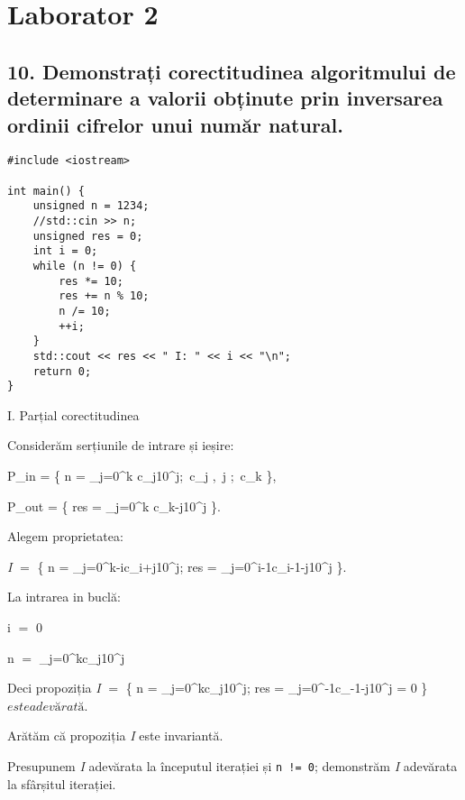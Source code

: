 \documentclass[11pt]{article}
\begin{document}
\pagebreak

\section*{Laborator 2}
\label{sec:org54114b2}

\subsection*{10. Demonstrați corectitudinea algoritmului de determinare a valorii obținute prin inversarea ordinii cifrelor unui număr natural.}
\label{sec:org7cba6e1}

\begin{verbatim}
#include <iostream>

int main() {
    unsigned n = 1234;
    //std::cin >> n;
    unsigned res = 0;
    int i = 0;
    while (n != 0) {
        res *= 10;
        res += n % 10;
        n /= 10;
        ++i;
    }
    std::cout << res << " I: " << i << "\n";
    return 0;
}
\end{verbatim}

\noindent
I. Parțial corectitudinea
\newline

Considerăm serțiunile de intrare și ieșire:

P_{in} = \left\{ n = \sum\limits_{j=0}^{k} c_{j}10^{j};\ 
                c_{j} \in {} ,\ \forall j \in {};\ 
                c_{k}  \right\},

P_{out} = \left\{ res = \sum\limits_{j=0}^{k} c_{k-j}10^{j} \right\}.

\vspace{14pt}
Alegem proprietatea:

\textit{I} $=$ \left\{
              n = \sum\limits_{j=0}^{k-i}c_{i+j}10^{j};
              res = \sum\limits_{j=0}^{i-1}c_{i-1-j}10^{j}
 \right\}.

\vspace{14pt}
La intrarea in buclă:

i $=$ 0

n $=$ \sum\limits_{j=0}^{k}c_{j}10^{j}

Deci propoziția
\textit{I} $=$ \left\{
              n = \sum\limits_{j=0}^{k}c_{j}10^{j};
              res = \sum\limits_{j=0}^{-1}c_{-1-j}10^{j} = 0
      \right\} 
$ este adevărată$.

Arătăm că propoziția \textit{I} este invariantă.

Presupunem \textit{I} adevărata la începutul iterației și \texttt{n != 0}; demonstrăm \textit{I} adevărata la sfârșitul iterației.
\end{document}
